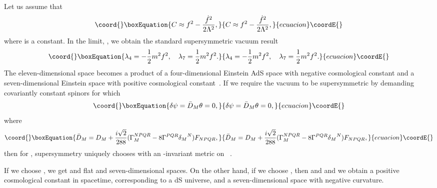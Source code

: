 \documentclass[a4paper,12pt]{article}
\begin{document}
Let us assume that
\begin{equation}\coord{}\boxEquation{
\label{Cconstant}
C\approx f^2-\frac{{\dot f}^2}{2\Lambda^2},
}{
C\approx f^2-\frac{{\dot f}^2}{2\Lambda^2},
}{ecuacion}\coordE{}\end{equation}
where \coordHE{} is a constant. In the
limit, \myHighlight{$\Lambda\rightarrow\infty$}\coordHE{}, we obtain the standard supersymmetric
vacuum result
\begin{equation}\coord{}\boxEquation{
\lambda_4=-\frac{1}{2}m^2f^2,\quad \lambda_7=\frac{1}{2}m^2f^2.
}{
\lambda_4=-\frac{1}{2}m^2f^2,\quad \lambda_7=\frac{1}{2}m^2f^2.
}{ecuacion}\coordE{}\end{equation}
The eleven-dimensional space becomes a product of a four-dimensional
Einstein AdS space with negative
cosmological constant and a seven-dimensional Einstein space with positive
cosmological constant~\cite{Duff2}.
If we require the vacuum to be supersymmetric by
demanding covariantly constant spinors \myHighlight{$\theta$}\coordHE{} for which
\begin{equation}\coord{}\boxEquation{
\delta\psi={\bar D}_M\theta=0,
}{
\delta\psi={\bar D}_M\theta=0,
}{ecuacion}\coordE{}\end{equation}
where
\begin{equation}\coord{}\boxEquation{
{\bar D}_M=D_M+\frac{i\sqrt{2}}{288}(\Gamma^{NPQR}_M-8\Gamma^{PQR}
{\delta_M}^N)F_{NPQR},
}{
{\bar D}_M=D_M+\frac{i\sqrt{2}}{288}(\Gamma^{NPQR}_M-8\Gamma^{PQR}
{\delta_M}^N)F_{NPQR},
}{ecuacion}\coordE{}\end{equation}
then for \coordHE{}, \coordHE{} supersymmetry uniquely chooses \coordHE{}
with an \coordHE{}-invariant metric on \coordHE{}~\cite{Englert,Duff2}.

If we choose
\coordHE{}, we get \coordHE{} and flat
\coordHE{} and seven-dimensional spaces. On the other hand, if we choose \coordHE{}, then \coordHE{} and \coordHE{} and we
obtain a positive cosmological constant in \coordHE{} spacetime,
corresponding to a dS universe, and a seven-dimensional space
with negative curvature.
\end{document}

